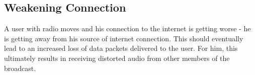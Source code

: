 
\subsection{Weakening Connection}
A user with radio moves and his connection to the internet is getting worse - he is getting away from his source of internet connection. This should eventually lead to an increased loss of data packets delivered to the user. For him, this ultimately results in receiving distorted audio from other members of the broadcast.


